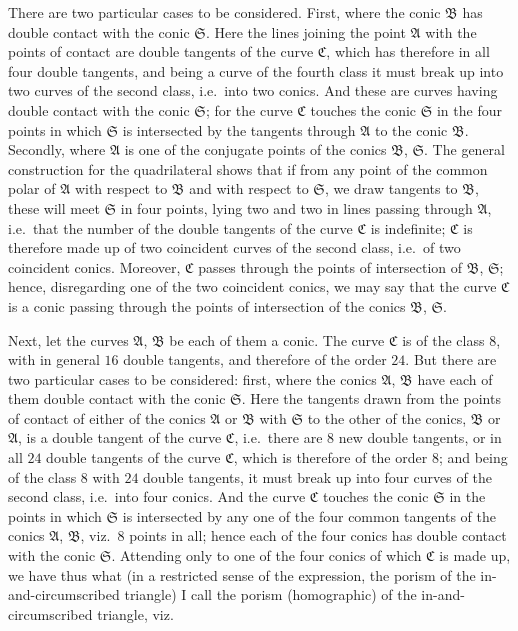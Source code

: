 \documentclass[11pt]{article}
\begin{document}
There are two particular cases to be considered. First, where the conic $\mathfrak{B}$ has
double contact with the conic $\mathfrak{S}$. Here the lines joining the point $\mathfrak{A}$ with the points
of contact are double tangents of the curve $\mathfrak{C}$, which has therefore in all four double
tangents, and being a curve of the fourth class it must break up into two curves
of the second class, i.e.\ into two conics. And these are curves having double contact
with the conic $\mathfrak{S}$; for the curve $\mathfrak{C}$ touches the conic $\mathfrak{S}$ in the four points in which
$\mathfrak{S}$ is intersected by the tangents through $\mathfrak{A}$ to the conic $\mathfrak{B}$. Secondly, where $\mathfrak{A}$ is
one of the conjugate points of the conics $\mathfrak{B}$, $\mathfrak{S}$. The general construction for the
quadrilateral shows that if from any point of the common polar of $\mathfrak{A}$ with respect to
$\mathfrak{B}$ and with respect to $\mathfrak{S}$, we draw tangents to $\mathfrak{B}$, these will meet $\mathfrak{S}$ in four points,
lying two and two in lines passing through $\mathfrak{A}$, i.e.\ that the number of the double
tangents of the curve $\mathfrak{C}$ is indefinite; $\mathfrak{C}$ is therefore made up of two coincident
curves of the second class, i.e.\ of two coincident conics. Moreover, $\mathfrak{C}$ passes through
the points of intersection of $\mathfrak{B}$, $\mathfrak{S}$; hence, disregarding one of the two coincident conics,
we may say that the curve $\mathfrak{C}$ is a conic passing through the points of intersection of
the conics $\mathfrak{B}$, $\mathfrak{S}$.

Next, let the curves $\mathfrak{A}$, $\mathfrak{B}$ be each of them a conic. The curve $\mathfrak{C}$ is of the
class $8$, with in general $16$ double tangents, and therefore of the order $24$. But
there are two particular cases to be considered: first, where the conics $\mathfrak{A}$, $\mathfrak{B}$ have
each of them double contact with the conic $\mathfrak{S}$. Here the tangents drawn from the
points of contact of either of the conics $\mathfrak{A}$ or $\mathfrak{B}$ with $\mathfrak{S}$ to the other of the conics,
$\mathfrak{B}$ or $\mathfrak{A}$, is a double tangent of the curve $\mathfrak{C}$, i.e.\ there are $8$ new double tangents,
or in all $24$ double tangents of the curve $\mathfrak{C}$, which is therefore of the order $8$;
and being of the class $8$ with $24$ double tangents, it must break up into four curves
of the second class, i.e.\ into four conics. And the curve $\mathfrak{C}$ touches the conic $\mathfrak{S}$ in
the points in which $\mathfrak{S}$ is intersected by any one of the four common tangents of
the conics $\mathfrak{A}$, $\mathfrak{B}$, viz.\ $8$ points in all; hence each of the four conics has double
contact with the conic $\mathfrak{S}$. Attending only to one of the four conics of which $\mathfrak{C}$ is
made up, we have thus what (in a restricted sense of the expression, the porism of
the in-and-circumscribed triangle) I call the porism (homographic) of the in-and-
circumscribed triangle, viz.
\end{document}
